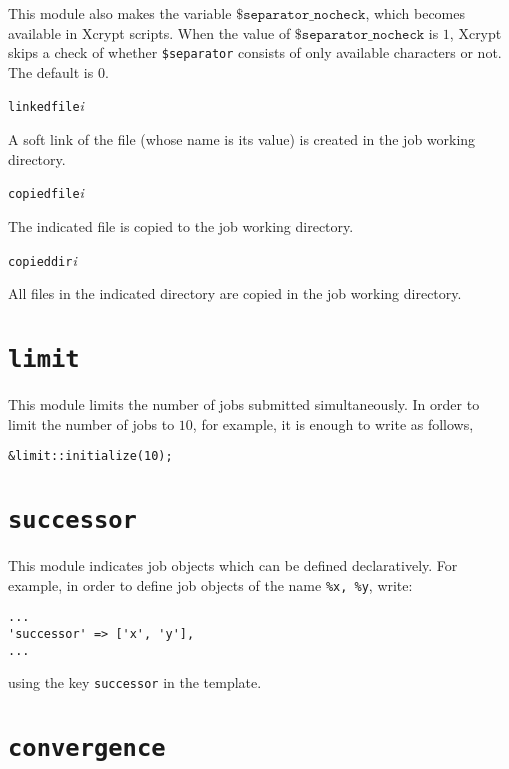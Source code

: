 \documentclass[a4paper,10pt]{report}
\begin{document}
This module also makes the variable $\texttt{\$separator\_nocheck}$,
which becomes available in Xcrypt scripts.  When the value of
$\texttt{\$separator\_nocheck}$ is $1$, Xcrypt skips a check of
whether \texttt{\$separator} consists of only available characters or not.
The default is $0$.


\texttt{linkedfile}\textit{i}

A soft link of the file (whose name is its value) is created in the
job working directory.

\texttt{copiedfile}\textit{i}

The indicated file is copied to the job working directory.

\texttt{copieddir}\textit{i}

All files in the indicated directory are copied
in the job working directory.



\section{\texttt{limit}}

This module limits the number of jobs submitted simultaneously.
In order to limit the number of jobs to $10$, for example, it is enough to
write as follows,
\begin{boxnote}
\begin{verbatim}
&limit::initialize(10);
\end{verbatim}
\end{boxnote}

\section{\texttt{successor}}

This module indicates job objects which can be defined declaratively.
For example, in order to define job objects of the name \texttt{\%x,
\%y}, write:
\begin{boxnote}
\begin{verbatim}
...
'successor' => ['x', 'y'],
...
\end{verbatim}
\end{boxnote}
\vspace{\baselineskip}
\noindent
using the key \texttt{successor} in the template.

\section{\texttt{convergence}}
\end{document}
